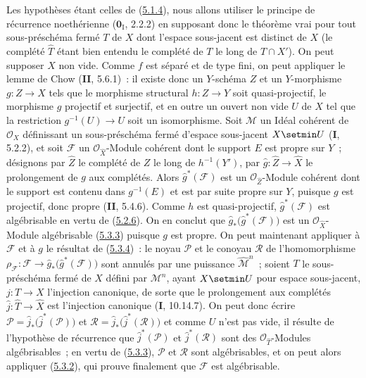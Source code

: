 Les hypothèses étant celles de (\hyperref[III.5.1.4-fr]{5.1.4}), nous allons
utiliser le principe de récurrence noethérienne ($\mathbf{0}_{\mathrm I}$, 2.2.2) en supposant
donc le théorème vrai pour tout sous-préschéma fermé $T$ de $X$ dont l'espace
sous-jacent est distinct de $X$ (le complété $\widehat T$ étant bien entendu le
complété de $T$ le long de $T\cap X'$). On peut supposer $X$ non vide. Comme $f$
est séparé et de type fini, on peut appliquer le lemme de Chow (\textbf{II}, 5.6.1)~: il
existe donc un $Y$-schéma $Z$ et un $Y$-morphisme $g:Z\to X$ tels que le morphisme
structural $h:Z\to Y$ soit quasi-projectif, le morphisme $g$ projectif et surjectif,
et en outre un ouvert non vide $U$ de $X$ tel que la restriction
$g^{-1}(U)\to U$ soit un isomorphisme. Soit $\mathcal M$ un Idéal cohérent de
$\mathcal O_X$ définissant un sous-préschéma fermé d'espace sous-jacent $X\setmin U$
(\textbf{I}, 5.2.2), et soit $\mathcal F$ un $\mathcal O_{\widehat X}$-Module cohérent dont
le support $E$ est propre sur $Y$~; désignons par $\widehat Z$ le complété de $Z$
le long de $h^{-1}(Y')$, par $\widehat g:\widehat Z\to\widehat X$ le prolongement
de $g$ aux complétés. Alors $\widehat g^{*}(\mathcal F)$ est un
$\mathcal O_{\widehat Z}$-Module cohérent dont le support est contenu dans
$g^{-1}(E)$ et est par suite propre sur $Y$, puisque $g$ est projectif, donc propre
(\textbf{II}, 5.4.6). Comme $h$ est quasi-projectif, $\widehat g^{*}(\mathcal F)$ est
algébrisable en vertu de (\hyperref[III.5.2.6-fr]{5.2.6}). On en conclut
que $\widehat g_*\bigl(\widehat g^{*}(\mathcal F)\bigr)$ est un
$\mathcal O_{\widehat X}$-Module algébrisable
(\hyperref[III.5.3.3-fr]{5.3.3}) puisque $g$ est propre. On peut maintenant
appliquer à $\mathcal F$ et à $g$ le résultat de
(\hyperref[III.5.3.4-fr]{5.3.4})~: le noyau $\mathcal P$ et le conoyau
$\mathcal R$ de l'homomorphisme
$\rho_{\mathcal F}:\mathcal F\to
\widehat g_*\bigl(\widehat g^{*}(\mathcal F)\bigr)$ sont annulés par une
puissance $\widehat{\mathcal M}^{n}$~; soient $T$ le sous-préschéma fermé de $X$
défini par $\mathcal M^n$, ayant $X\setmin U$ pour espace sous-jacent,
$j:T\to X$ l'injection canonique, de sorte que le prolongement aux complétés
$\widehat j:\widehat T\to\widehat X$ est l'injection canonique (\textbf{I}, 10.14.7). On
peut donc écrire
$\mathcal P=\widehat j_*\bigl(\widehat j^{*}(\mathcal P)\bigr)$ et
$\mathcal R=\widehat j_*\bigl(\widehat j^{*}(\mathcal R)\bigr)$ et comme $U$
n'est pas vide, il résulte de l'hypothèse de récurrence que
$\widehat j^{*}(\mathcal P)$ et $\widehat j^{*}(\mathcal R)$ sont des
$\mathcal O_{\widehat T}$-Modules algébrisables~; en vertu de
(\hyperref[III.5.3.3-fr]{5.3.3}), $\mathcal P$ et $\mathcal R$ sont
algébrisables, et on peut alors appliquer (\hyperref[III.5.3.2-fr]{5.3.2}), qui
prouve finalement que $\mathcal F$ est algébrisable.

